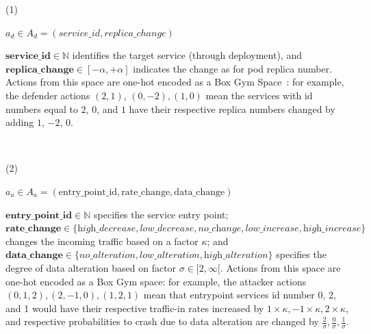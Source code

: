 \vspace{0.3cm}

\indent\begin{minipage}{0.15\linewidth}
    (1)
\end{minipage}
\begin{minipage}{0.9\linewidth}
    \raggedright
    $\displaystyle a_d \in A_d = (service\_id, replica\_change)$
\end{minipage}

\vspace{0.3cm}

\indent $\mathbf{service\_id} \in \mathbb{N}$ identifies the target service (through deployment), and $\mathbf{replica\_change} \in [-\alpha, +\alpha]$ indicates the change as for pod replica number. Actions from this space are one-hot encoded as a Box Gym Space~\cite{openAIGymActionSpaces}: for example, the defender actions $(2,1)$, $(0,-2), (1,0)$ mean the services with id numbers equal to $2$, $0$, and $1$ have their respective replica numbers changed by adding $1$, $-2$, $0$.

\

\indent\begin{minipage}{0.06\linewidth}
    (2)
\end{minipage}
\begin{minipage}{0.9\linewidth}
    \raggedright
    $\displaystyle a_a \in A_a = (\text{entry\_point\_id}, \text{rate\_change}, \text{data\_change})$
\end{minipage}

\vspace{0.3cm}

\indent $\mathbf{entry\_point\_id} \in \mathbb{N}$ specifies the service entry point;
$\mathbf{rate\_change} \in \{\textit{high\_decrease}, \textit{low\_decrease}, \textit{no\_change}, \allowbreak \textit{low\_increase}, \allowbreak \textit{high\_increase}\}$ changes the incoming traffic based on a factor $\kappa$; and $\mathbf{data\_change} \in \{\textit{no\_alteration}, \allowbreak \textit{low\_alteration}, \allowbreak \textit{high\_alteration}\}$ specifies the degree of data alteration based on factor $\sigma \in [2,\infty[$. Actions from this space are one-hot encoded as a Box Gym space: for example, the attacker actions $(0,1,2), (2,-1,0), (1,2,1)$ mean that entrypoint services id number 0, 2, and 1 would have their respective traffic-in rates increased by $1 \times \kappa, -1 \times \kappa, 2 \times \kappa$, and respective probabilities to crash due to data alteration are changed by $\frac{2}{\sigma}, \frac{0}{\sigma}, \frac{1}{\sigma}$.



